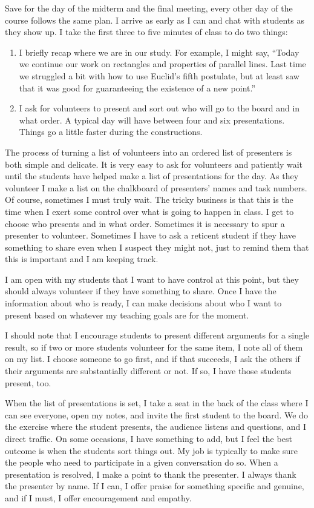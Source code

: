 \begin{annotation}
Save for the day of the midterm and the final meeting, every other day of the course follows the same plan. I arrive as early as I can and chat with students as they show up. I take the first three to five minutes of class to do two things: 
\begin{enumerate}
\item  I briefly recap where we are in our study. For example, I might say, ``Today we continue our work on rectangles and properties of parallel lines. Last time we struggled a bit with how to use Euclid's fifth postulate, but at least saw that it was good for guaranteeing the existence of a new point.''
\item I ask for volunteers to present and sort out who will 
go to the board and in what order. A typical day will have between four and six presentations. Things go a little faster during the constructions.
\end{enumerate}

The process of turning a list of volunteers into an ordered list of presenters is both simple and delicate. It is very easy to ask for volunteers and patiently wait until the students have helped make a list of presentations for the day. As they volunteer I make a list on the chalkboard of presenters' names and task numbers. Of course, sometimes I must truly wait. The tricky business is that this is the time when I exert some control over what is going to happen in class. I get to choose who presents and in what order. Sometimes it is necessary to spur a presenter to volunteer. Sometimes I have to ask a reticent student if they have something to share even when I suspect they might not, just to remind them that this is important and I am keeping track.

I am open with my students that I want to have control at this point, but they should always volunteer if they have something to share. Once I have the information about who is ready, I can make decisions about who I want to present based on whatever my teaching goals are for the moment.

I should note that I encourage students to present different arguments for a single result, so if two or more students volunteer for the same item, I note all of them on my list. I choose someone to go first, and if that succeeds, I ask the others if their arguments are substantially different or not. If so, I have those students present, too.

When the list of presentations is set, I take a seat in the back of the class where I can see everyone, open my notes, and invite the first student to the board. We do the exercise where the student presents, the audience listens and questions, and I direct traffic. On some occasions, I have something to add, but I feel the best outcome is when the students sort things out. My job is typically to make sure the people who need to participate in a given conversation do so. When a presentation is resolved, I make a point to thank the presenter. I always thank the presenter by name. If I can, I offer praise for something specific and genuine, and if I must, I offer encouragement and empathy.


\end{annotation}
